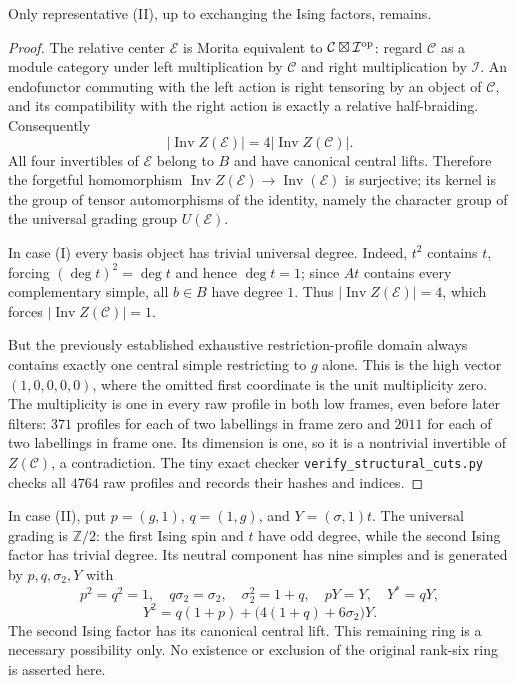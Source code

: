 \documentclass[11pt]{article}
\newcommand{\I}{\mathcal I}\newcommand{\E}{\mathcal E}\newcommand{\C}{\mathcal C}
\begin{document}
\begin{proposition}
Only representative (II), up to exchanging the Ising factors, remains.
\end{proposition}
\begin{proof}
The relative center $\E$ is Morita equivalent to
$\C\boxtimes\I^{\rm op}$: regard $\C$ as a module category under
left multiplication by $\C$ and right multiplication by $\I$.
An endofunctor commuting with the left action is right tensoring by
an object of $\C$, and its compatibility with the right action is
exactly a relative half-braiding. Consequently
\[
 |\operatorname{Inv}Z(\E)|=4|\operatorname{Inv}Z(\C)|.
\]
All four invertibles of $\E$ belong to $B$ and have canonical central
lifts. Therefore the forgetful homomorphism
$\operatorname{Inv}Z(\E)\to\operatorname{Inv}(\E)$ is surjective;
its kernel is the group of tensor automorphisms of the identity,
namely the character group of the universal grading group $U(\E)$.

In case (I) every basis object has trivial universal degree. Indeed,
$t^2$ contains $t$, forcing $(\deg t)^2=\deg t$ and hence $\deg t=1$; since $At$
contains every complementary simple, all $b\in B$ have degree $1$.
Thus $|\operatorname{Inv}Z(\E)|=4$, which forces
$|\operatorname{Inv}Z(\C)|=1$.

But the previously established exhaustive restriction-profile domain
always contains exactly one central simple restricting to $g$ alone.
This is the high vector $(1,0,0,0,0)$, where the omitted first
coordinate is the unit multiplicity zero. The multiplicity is one
in every raw profile in both low frames, even before later filters:
$371$ profiles for each of two labellings in frame zero and $2011$
for each of two labellings in frame one. Its dimension is one,
so it is a nontrivial invertible of $Z(\C)$, a contradiction.
The tiny exact checker \texttt{verify\_structural\_cuts.py}
checks all $4764$ raw profiles and records their hashes and indices.
\end{proof}

In case (II), put $p=(g,1)$, $q=(1,g)$, and $Y=(\sigma,1)t$.
The universal grading is $\mathbb Z/2$: the first Ising spin and
$t$ have odd degree, while the second Ising factor has trivial degree.
Its neutral component has nine simples and is generated by
$p,q,\sigma_2,Y$ with
\[
 p^2=q^2=1,\quad q\sigma_2=\sigma_2,
 \quad\sigma_2^2=1+q,\quad pY=Y,\quad Y^*=qY,
\]
\[
 Y^2=q(1+p)+\bigl(4(1+q)+6\sigma_2\bigr)Y.
\]
The second Ising factor has its canonical central lift.
This remaining ring is a necessary possibility only. No existence
or exclusion of the original rank-six ring is asserted here.
\end{document}
